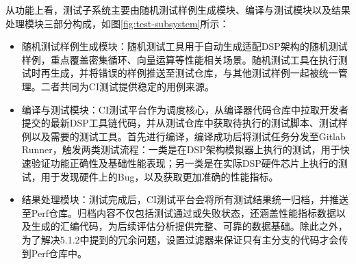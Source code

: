 \par

从功能上看，测试子系统主要由随机测试样例生成模块、编译与测试模块以及结果处理模块三部分构成，如图\ref{fig:test-subsystem}所示：

\begin{itemize}
	\item
	随机测试样例生成模块：随机测试工具用于自动生成适配DSP架构的随机测试样例，重点覆盖密集循环、向量运算等性能相关场景。随机测试工具在执行测试时再生成，并将错误的样例推送至测试仓库，与其他测试样例一起被统一管理。二者共同为CI测试提供稳定的用例来源。
	
	\item
	编译与测试模块：CI测试平台作为调度核心，从编译器代码仓库中拉取开发者提交的最新DSP工具链代码，并从测试仓库中获取待执行的测试脚本、测试样例以及需要的测试工具。首先进行编译，编译成功后将测试任务分发至Gitlab Runner，触发两类测试流程：一类是在DSP架构模拟器上执行的测试，用于快速验证功能正确性及基础性能表现；另一类是在实际DSP硬件芯片上执行的测试，用于发现硬件上的Bug，以及获取更加准确的性能指标。
	
	\item
	结果处理模块：测试完成后，CI测试平台会将所有测试结果统一归档，并推送至Perf仓库。归档内容不仅包括测试通过或失败状态，还涵盖性能指标数据以及生成的汇编代码，为后续评估分析提供完整、可靠的数据基础。除此之外，为了解决5.1.2中提到的冗余问题，设置过滤器来保证只有主分支的代码才会传到Perf仓库中。
	
\end{itemize}

